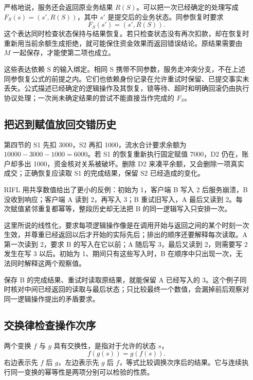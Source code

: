 严格地说，服务还会返回原业务结果 \(R(S)\)。可以把一次已经确定的处理写成 \(F_S(s)=(s',R(S))\)，其中 \(s'\) 是提交后的业务状态。同参恢复时要求
\[
 F_S(s')=(s',R(S)).
\]
这个表达同时检查状态保持与结果恢复。若只检查状态没有再次扣款，却在恢复时重新用当前余额生成拒绝，就可能保住资金效果而返回错误结论。原结果需要由 \(M\) 一起保存，才能使第二项也成立。

这些表达依赖 S 的输入绑定。相同 S 携带不同参数，服务走冲突分支，不在上述同参恢复公式的前提之内。它们也依赖身份记录在允许重试时保留、已提交事实未丢失。公式描述已经确定的逻辑操作及其恢复，锁等待、超时和明确回滚仍由执行协议处理；一次尚未确定结果的尝试不能直接当作完成的 \(F_S\)。

\subsection*{把迟到赋值放回交错历史}

第四节的 S1 先扣 3000，S2 再扣 1000，流水合计要求余额为 \(10000-3000-1000=6000\)。若 S1 的恢复重新执行固定赋值 7000，D2 仍在，账户却多出 1000，资金核对关系被破坏。删除 D2 来凑平余额，又会删除一项真实成交；正确恢复应读取 S1 的完成结果，保留 S2 已经造成的变化。



RIFL 用共享数值给出了更小的反例：初始为 1，客户端 B 写入 2 后服务崩溃，B 没收到响应；客户端 A 读到 2，再写入 3；B 重试旧写入，A 最后又读到 2\cite{rifl}。每次赋值紧邻重复都幂等，整段历史却无法把 B 的同一逻辑写入只安排一次。

这里所说的线性化，要求每项逻辑操作像是在调用开始与返回之间的某个时刻一次生效，并尊重已经返回以后才开始的实际先后；排出的顺序还要解释每次读取。A 第一次读到 2，要求 B 的写入在它以前；A 随后写 3，最后又读到 2，则需要写 2 发生在写 3 以后。初始为 1、期间只有这些写入时，B 在顺序中只出现一次，无法同时解释这两个观察值。

保存 B 的完成结果、重试时读取原结果，就能保留 A 已经写入的 3。这个例子同时核对中间已经返回的读取与最后状态；只比较最终一个数值，会漏掉前后观察对同一逻辑操作提出的矛盾要求。

\subsection*{交换律检查操作次序}

两个变换 \(f\) 与 \(g\) 具有交换性，是指对于允许的状态 \(s\)，
\[
 f(g(s))=g(f(s)).
\]
右边表示先 \(f\) 后 \(g\)，左边表示先 \(g\) 后 \(f\)，等式比较调换次序后的结果。它与连续执行同一变换的幂等性是两项分别可以检验的性质。

